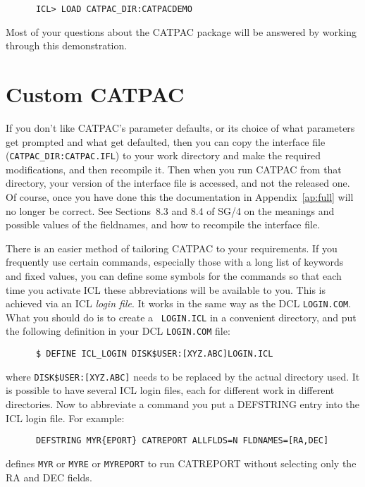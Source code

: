 \begin{verbatim}
      ICL> LOAD CATPAC_DIR:CATPACDEMO
\end{verbatim}

Most of your questions about the CATPAC package will be answered by working 
through this demonstration.

\section{Custom CATPAC}
\label{se:custom}

If you don't like {\small CATPAC}'s parameter defaults, or its choice of what
parameters get prompted and what get defaulted, then you can copy the interface
file ({\tt CATPAC\_DIR:CATPAC.IFL}) to your work directory and make the
required modifications, and then recompile it.  Then when you run CATPAC from
that directory, your version of the interface file is accessed, and not the
released one.  Of course, once you have done this the documentation in
Appendix~\ref{ap:full} will no longer be correct.  See Sections~8.3 and 8.4 of
SG/4 on the meanings and possible values of the fieldnames, and how to
recompile the interface file.

There is an easier method of tailoring {\small CATPAC} to your  requirements.
If you frequently use certain commands, especially those with a long list of
keywords and fixed values, you can define some symbols for the commands so that
each time you activate {\small ICL} these abbreviations will be available to
you.  This is achieved via an {\small ICL} {\em login file}. It works in the
same way as the DCL {\tt LOGIN.COM}.  What you should do is to create a {\tt
LOGIN.ICL} in a convenient  directory, and put the following definition in your
DCL {\tt LOGIN.COM} file:

\begin{verbatim}
      $ DEFINE ICL_LOGIN DISK$USER:[XYZ.ABC]LOGIN.ICL
\end{verbatim}

where {\tt DISK\$USER:[XYZ.ABC]} needs to be replaced by the actual  directory
used.  It is possible to have several {\small ICL} login files, each for
different work in different directories.  Now to abbreviate a command you put a
DEFSTRING entry into the {\small ICL} login file. For example:

\begin{verbatim}
      DEFSTRING MYR{EPORT} CATREPORT ALLFLDS=N FLDNAMES=[RA,DEC]
\end{verbatim}
defines {\tt MYR} or {\tt MYRE} or {\tt MYREPORT} to run CATREPORT without
selecting only the RA and DEC fields.

